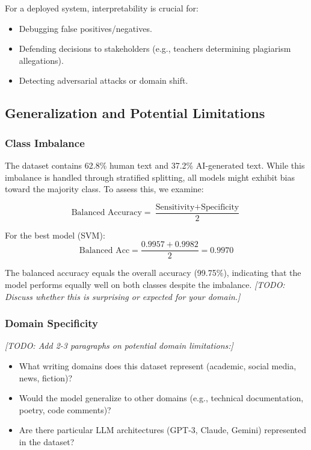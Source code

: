 \documentclass[12pt, a4paper]{article}
\begin{document}
For a deployed system, interpretability is crucial for:
\begin{itemize}
    \item Debugging false positives/negatives.
    \item Defending decisions to stakeholders (e.g., teachers determining plagiarism allegations).
    \item Detecting adversarial attacks or domain shift.
\end{itemize}

\subsection{Generalization and Potential Limitations}

\subsubsection{Class Imbalance}

The dataset contains 62.8\% human text and 37.2\% AI-generated text. While this imbalance is handled through stratified splitting, all models might exhibit bias toward the majority class. To assess this, we examine:

\begin{equation}
\text{Balanced Accuracy} = \frac{\text{Sensitivity} + \text{Specificity}}{2}
\end{equation}

For the best model (SVM):
\begin{equation}
\text{Balanced Acc} = \frac{0.9957 + 0.9982}{2} = 0.9970
\end{equation}

The balanced accuracy equals the overall accuracy (99.75\%), indicating that the model performs equally well on both classes despite the imbalance. \textit{[TODO: Discuss whether this is surprising or expected for your domain.]}

\subsubsection{Domain Specificity}

\textit{[TODO: Add 2-3 paragraphs on potential domain limitations:]}
\begin{itemize}
    \item What writing domains does this dataset represent (academic, social media, news, fiction)?
    \item Would the model generalize to other domains (e.g., technical documentation, poetry, code comments)?
    \item Are there particular LLM architectures (GPT-3, Claude, Gemini) represented in the dataset?
\end{itemize}
\end{document}
